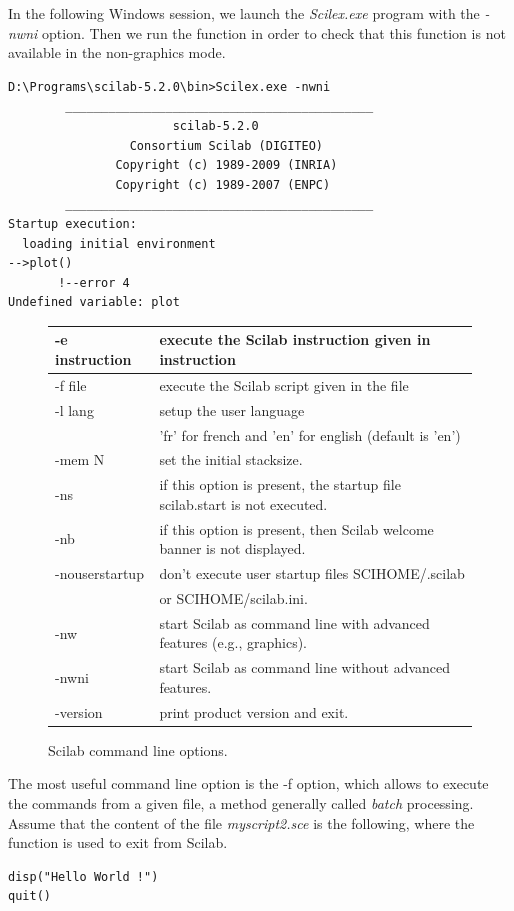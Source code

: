 In the following Windows session, we launch the \emph{Scilex.exe}
program with the \emph{-nwni} option. Then we run the 
function in order to check that this function is not available 
in the non-graphics mode.
\begin{lstlisting}
D:\Programs\scilab-5.2.0\bin>Scilex.exe -nwni
        ___________________________________________
                       scilab-5.2.0
                 Consortium Scilab (DIGITEO)
               Copyright (c) 1989-2009 (INRIA)
               Copyright (c) 1989-2007 (ENPC)
        ___________________________________________
Startup execution:
  loading initial environment
-->plot()
       !--error 4
Undefined variable: plot
\end{lstlisting}

\begin{figure}
\begin{center}
\begin{tabular}{|l|l|}
\hline
-e instruction & execute the Scilab instruction given in instruction\\
\hline
-f file & execute the Scilab script given in the file\\
\hline
-l lang &  setup the user language \\
&'fr' for french and 'en' for english (default is 'en')\\
\hline
-mem N & set the initial stacksize.\\
\hline
-ns & if this option is present, the startup file scilab.start is not executed.\\
\hline
-nb & if this option is present, then Scilab welcome banner is not displayed.\\
\hline
-nouserstartup & don't execute user startup files SCIHOME/.scilab \\
& or SCIHOME/scilab.ini.\\
\hline
-nw & start Scilab as command line with advanced features (e.g., graphics).\\
\hline
-nwni & start Scilab as command line without advanced features.\\
\hline
-version & print product version and exit.\\
\hline
\end{tabular}
\end{center}
\caption{Scilab command line options.}
\label{fig-scilab-commandlineoptions}
\end{figure}

The most useful command line option is the -f option, which 
allows to execute the commands from a given file, a method 
generally called \emph{batch} processing. 
Assume that the content of the file \emph{myscript2.sce} is 
the following, where the  function is used 
to exit from Scilab.
\lstset{language=scilabscript}
\begin{lstlisting}
disp("Hello World !")
quit()
\end{lstlisting}


